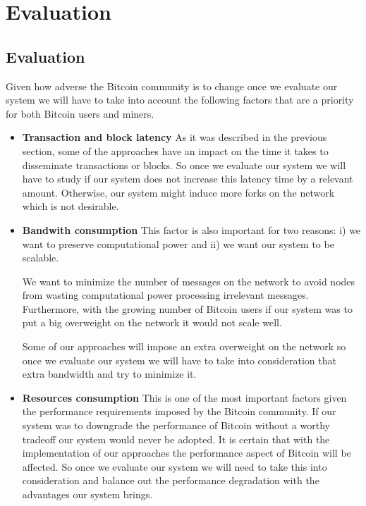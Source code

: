 \chapter{Evaluation}
\label{chap:evaluation}
\section{Evaluation}
\label{sec:evaluation}
Given how adverse the Bitcoin community is to change once we evaluate our system we will have to take into account the following factors that are a priority for both Bitcoin users and miners.

\begin{itemize}
\item \textbf{Transaction and block latency} As it was described in the previous section, some of the approaches have an impact on the time it takes to disseminate transactions or blocks. So once we evaluate our system we will have to study if our system does not increase this latency time by a relevant amount. Otherwise, our system might induce more forks on the network which is not desirable.

\item \textbf{Bandwith consumption} This factor is also important for two reasons: i) we want to preserve computational power and ii) we want our system to be scalable.

We want to minimize the number of messages on the network to avoid nodes from wasting computational power processing irrelevant messages. Furthermore, with the growing number of Bitcoin users if our system was to put a big overweight on the network it would not scale well.

Some of our approaches will impose an extra overweight on the network so once we evaluate our system we will have to take into consideration that extra bandwidth and try to minimize it.

\item \textbf{Resources consumption} This is one of the most important factors given the performance requirements imposed by the Bitcoin community. If our system was to downgrade the performance of Bitcoin without a worthy tradeoff our system would never be adopted. It is certain that with the implementation of our approaches the performance aspect of Bitcoin will be affected. So once we evaluate our system we will need to take this into consideration and balance out the performance degradation with the advantages our system brings.
\end{itemize}

